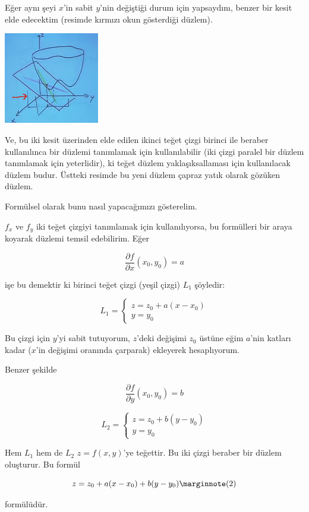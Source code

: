 \documentclass[12pt,fleqn]{article}\usepackage{../../common}
\begin{document}
Eğer aynı şeyi $x$'in sabit $y$'nin değiştiği durum için yapsaydım,
benzer bir kesit elde edecektim (resimde kırmızı okun gösterdiği düzlem). 

\includegraphics[height=4cm]{9_2.png}

Ve, bu iki kesit üzerinden elde edilen ikinci teğet çizgi birinci ile beraber
kullanılınca bir düzlemi tanımlamak için kullanılabilir (iki çizgi paralel bir
düzlem tanımlamak için yeterlidir), ki teğet düzlem yaklaşıksallaması için
kullanılacak düzlem budur. Üstteki resimde bu yeni düzlem çapraz yatık olarak
gözüken düzlem.

Formülsel olarak bunu nasıl yapacağımızı gösterelim.

$f_x$ ve $f_y$ iki teğet çizgiyi tanımlamak için kullanılıyorsa, bu
formülleri bir araya koyarak düzlemi temsil edebilirim. Eğer

$$ \frac{\partial f}{\partial x}(x_0,y_0) = a $$

işe bu demektir ki birinci teğet çizgi (yeşil çizgi) $L_1$ şöyledir:

$$ 
L_1 = 
\left\{ \begin{array}{l}
z = z_0 + a(x - x_0) \\
y = y_0
\end{array} \right.
$$

Bu çizgi için $y$'yi sabit tutuyorum, $z$'deki değişimi $z_0$ üstüne eğim
$a$'nin katları kadar ($x$'in değişimi oranında çarparak) ekleyerek
hesaplıyorum. 

Benzer şekilde

$$ \frac{\partial f}{\partial y}(x_0,y_0) = b $$

$$ 
L_2 = 
\left\{ \begin{array}{l}
z = z_0 + b(y - y_0) \\
y = y_0
\end{array} \right.
$$

Hem $L_1$ hem de $L_2$ $z = f(x,y)$'ye teğettir. Bu iki çizgi beraber bir düzlem
oluşturur. Bu formül

$$
z = z_0 + a(x-x_0) + b(y-y_0) 
\mlabel{2}
$$

formülüdür. 
\end{document}
